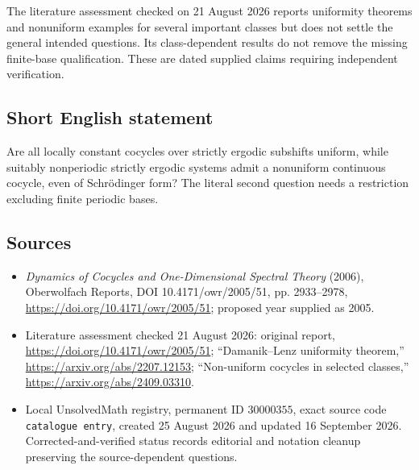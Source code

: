 \documentclass[11pt]{article}
\begin{document}
The literature assessment checked on 21 August 2026 reports uniformity theorems and nonuniform examples for several important classes but does not settle the general intended questions. Its class-dependent results do not remove the missing finite-base qualification. These are dated supplied claims requiring independent verification.
\subsection{Short English statement}
Are all locally constant cocycles over strictly ergodic subshifts uniform, while suitably nonperiodic strictly ergodic systems admit a nonuniform continuous cocycle, even of Schr\"odinger form? The literal second question needs a restriction excluding finite periodic bases.
\subsection{Sources}
\begin{itemize}
\item \emph{Dynamics of Cocycles and One-Dimensional Spectral Theory} (2006), Oberwolfach Reports, DOI 10.4171/owr/2005/51, pp. 2933--2978, \url{https://doi.org/10.4171/owr/2005/51}; proposed year supplied as 2005.
\item Literature assessment checked 21 August 2026: original report, \url{https://doi.org/10.4171/owr/2005/51}; ``Damanik--Lenz uniformity theorem,'' \url{https://arxiv.org/abs/2207.12153}; ``Non-uniform cocycles in selected classes,'' \url{https://arxiv.org/abs/2409.03310}.
\item Local UnsolvedMath registry, permanent ID $30000355$, exact source code \texttt{catalogue entry}, created 25 August 2026 and updated 16 September 2026. Corrected-and-verified status records editorial and notation cleanup preserving the source-dependent questions.
\end{itemize}
\end{document}
